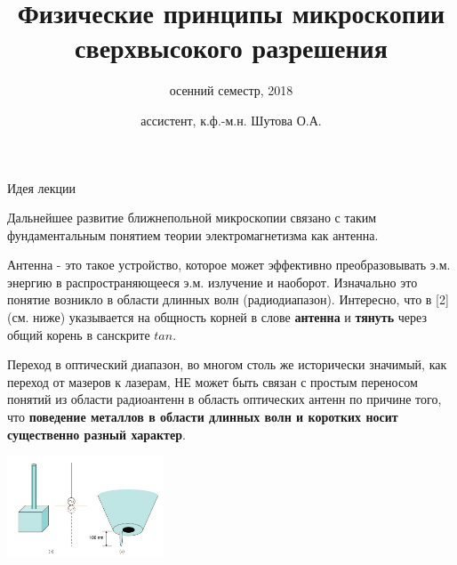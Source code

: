 \documentclass[9pt, compress, xcolor=table]{beamer}
\title{Физические принципы микроскопии сверхвысокого разрешения}
\subtitle{осенний семестр, 2018}
\author{ассистент, к.ф.-м.н. Шутова О.А.}
\institute{МГУ им. М.В. Ломоносова, физический факультет}
\begin{document}
\maketitle


\begin{frame}{Идея лекции}


Дальнейшее развитие ближнепольной микроскопии связано с таким фундаментальным понятием теории электромагнетизма как \textcolor{red!50!black}{антенна}. 

\textcolor{red!50!black}{Антенна} - это такое устройство, которое может \textcolor{red!50!black}{эффективно} преобразовывать э.м. энергию в распространяющееся э.м. излучение и наоборот. Изначально это понятие возникло в области длинных волн (радиодиапазон). Интересно, что в [2] (см. ниже) указывается на общность корней в слове \textbf{антенна} и \textbf{тянуть} через общий корень в санскрите $tan$. 

Переход в оптический диапазон, во многом столь же исторически значимый, как переход от мазеров к лазерам, НЕ может быть связан с простым переносом понятий из области радиоантенн в область оптических антенн по причине того, что \textbf{поведение металлов в области длинных волн и коротких носит существенно разный характер}.

\centering
\includegraphics[width=0.35\textwidth]{optant1}
\end{frame}
\end{document}
